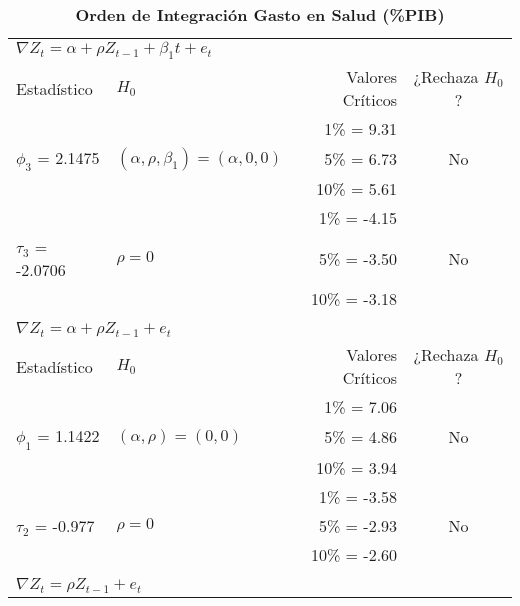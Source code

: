\begin{table}[ht]
\caption{\textbf{Orden de Integración Gasto en Salud (\%PIB)}}
\centering
	\begin{tabular}{llrc}
	\multicolumn{2}{l}{$\nabla Z_t = \alpha + \rho Z_{t-1} + \beta_1 t + e_t$} \\
	\cline{1-2}
		Estadístico    			& $H_0$ 							& Valores Críticos 	& ¿Rechaza $H_0$? \\
		\hline
							&								& 1\%   = 9.31		&			\\
		 $\phi_3$ = 2.1475		& $(\alpha, \rho, \beta_1)=(\alpha,0,0)$     & 5\%   = 6.73		&       No		\\
							&  								& 10\% = 5.61		&       		\\
	\cline{1-4}				
							&								& 1\%   = -4.15		&			\\
		 $\tau_3$ = -2.0706		& $\rho=0$						& 5\%   = -3.50		&       No		\\
							&  								& 10\% = -3.18		&       		\\
	\firsthline
							&								&				&			\\
	\multicolumn{2}{l}{$\nabla Z_t = \alpha + \rho Z_{t-1} + e_t$} \\
	\cline{1-2}
		Estadístico    			& $H_0$ 							& Valores Críticos 	& ¿Rechaza $H_0$? \\
		\hline
							&								& 1\%   = 7.06		&			\\
		 $\phi_1$ = 1.1422		& $(\alpha, \rho)=(0,0)$     			& 5\%   = 4.86		&       No		\\
							&  								& 10\% = 3.94		&       		\\
	\cline{1-4}				
							&								& 1\%   = -3.58		&			\\
		 $\tau_2$ = -0.977		& $\rho=0$						& 5\%   = -2.93		&       No		\\
							&  								& 10\% = -2.60		&       		\\
	\firsthline
							&								&				&			\\
	\multicolumn{2}{l}{$\nabla Z_t = \rho Z_{t-1} + e_t$} \\

\end{tabular}
\end{table}
